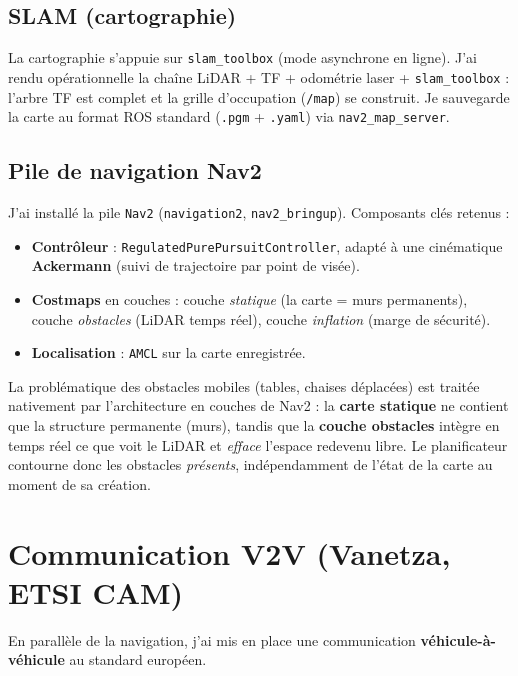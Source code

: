 \documentclass[a4paper,11pt]{article}
\begin{document}
\subsection{SLAM (cartographie)}
La cartographie s'appuie sur \texttt{slam\_toolbox} (mode asynchrone en ligne).
J'ai rendu opérationnelle la chaîne LiDAR + TF + odométrie laser +
\texttt{slam\_toolbox} : l'arbre TF est complet et la grille d'occupation
(\texttt{/map}) se construit. Je sauvegarde la carte au format ROS standard
(\texttt{.pgm} + \texttt{.yaml}) via \texttt{nav2\_map\_server}.

\subsection{Pile de navigation Nav2}
J'ai installé la pile \texttt{Nav2} (\texttt{navigation2}, \texttt{nav2\_bringup}).
Composants clés retenus :
\begin{itemize}[leftmargin=1.4em, nosep]
  \item \textbf{Contrôleur} : \texttt{RegulatedPurePursuitController}, adapté à une
        cinématique \textbf{Ackermann} (suivi de trajectoire par point de visée).
  \item \textbf{Costmaps} en couches : couche \emph{statique} (la carte = murs
        permanents), couche \emph{obstacles} (LiDAR temps réel), couche
        \emph{inflation} (marge de sécurité).
  \item \textbf{Localisation} : \texttt{AMCL} sur la carte enregistrée.
\end{itemize}

\begin{tcolorbox}[colback=lightblue, colframe=primary, title=\textbf{Gestion des obstacles dynamiques (mobilier)}]
La problématique des obstacles mobiles (tables, chaises déplacées) est traitée
nativement par l'architecture en couches de Nav2 : la \textbf{carte statique} ne
contient que la structure permanente (murs), tandis que la \textbf{couche obstacles}
intègre en temps réel ce que voit le LiDAR et \emph{efface} l'espace redevenu libre.
Le planificateur contourne donc les obstacles \emph{présents}, indépendamment de
l'état de la carte au moment de sa création.
\end{tcolorbox}

\section{Communication V2V (Vanetza, ETSI CAM)}
En parallèle de la navigation, j'ai mis en place une communication
\textbf{véhicule-à-véhicule} au standard européen.
\end{document}
